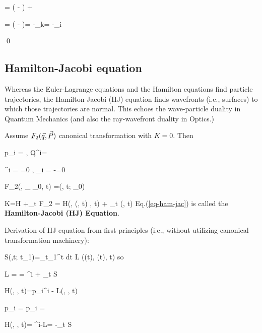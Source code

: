 \beq
{}
=
\left(
-
\right)
+
\eeq

\beq
{}
=
\left(
-
\right)=
-_k=
-_i
\eeq



\qed

\subsection{Hamilton-Jacobi equation}

Whereas the Euler-Lagrange
equations and the Hamilton equations find particle trajectories,
the Hamilton-Jacobi (HJ) equation finds 
wavefronts (i.e., surfaces)
to which those trajectories
are normal. This echoes
the wave-particle duality 
in Quantum Mechanics (and 
also the ray-wavefront duality in Optics.)

Assume $F_2({\vec{q}}, \vec{P})$ canonical transformation with $K=0$.
Then

\beq
p_i = ,
\quad 
Q^i= 
\eeq


\beq
{}^i = =0
,\quad 
{}_i = -=0
\eeq


\beq
F_2(\vecq, _{ _0}, t)
=\cals (\vecq, t; _0)
\eeq

\beq
K=H +\partial_t F_2\implies
\quad{}= H\left(\vecq, \pderAB{\;}{\vecq}\cals(\vecq, t) , t\right) + \partial_t \cals(\vecq, t)
\label{eq-ham-jac}
\eeq
Eq.(\ref{eq-ham-jac})
is called the
{\bf Hamilton-Jacobi (HJ) Equation}.


Derivation of HJ 
equation from first
principles
(i.e., without utilizing canonical transformation
machinery):

\beq
S(\vecq,t; t_1)=\int_{t_1}^{t}
dt\; L
(\vecq(t), \dot{\vecq}(t), t)
\eeq
so

\beq
L = =
^i + \partial_t S
\eeq

\beq
H(\vecq, \vecp, t)=p_i^i - L(\vecq, , t)
\eeq

\beq
p_i = 
\implies
p_i = 
\eeq

\beq
H(\vecq, ,
t)=
^i-L=
-\partial_t S
\eeq




